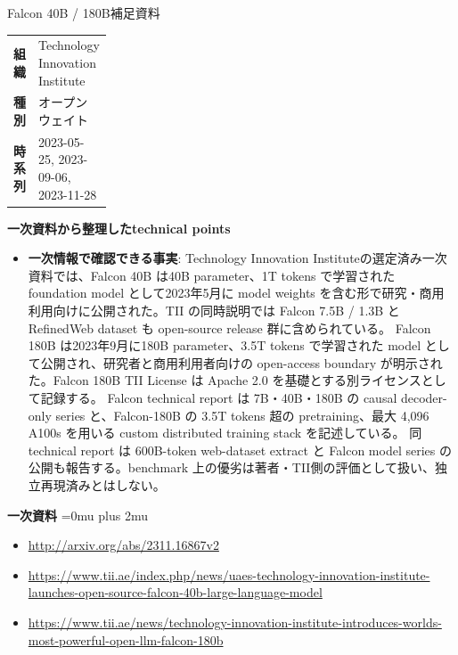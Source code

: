\begin{technicalnote}{Falcon 40B / 180B}{補足資料}
\begingroup
\begin{tabularx}{\linewidth}{@{}>{\bfseries}p{0.22\linewidth}X@{}}
組織 & Technology Innovation Institute \\
種別 & オープンウェイト \\
時系列 & 2023-05-25, 2023-09-06, 2023-11-28 \\
\end{tabularx}
\smallskip
{\bfseries 一次資料から整理したtechnical points}
\begin{itemize}[leftmargin=1.5em,itemsep=0.35em]
\item \textbf{一次情報で確認できる事実}: Technology Innovation Instituteの選定済み一次資料では、Falcon 40B は40B parameter、1T tokens で学習された foundation model として2023年5月に model weights を含む形で研究・商用利用向けに公開された。TII の同時説明では Falcon 7.5B / 1.3B と RefinedWeb dataset も open-source release 群に含められている。 Falcon 180B は2023年9月に180B parameter、3.5T tokens で学習された model として公開され、研究者と商用利用者向けの open-access boundary が明示された。Falcon 180B TII License は Apache 2.0 を基礎とする別ライセンスとして記録する。 Falcon technical report は 7B・40B・180B の causal decoder-only series と、Falcon-180B の 3.5T tokens 超の pretraining、最大 4,096 A100s を用いる custom distributed training stack を記述している。 同 technical report は 600B-token web-dataset extract と Falcon model series の公開も報告する。benchmark 上の優劣は著者・TII側の評価として扱い、独立再現済みとはしない。
\end{itemize}
\begin{minipage}{\linewidth}
\begin{samepage}
{\bfseries 一次資料}
\begingroup\sloppy
\Urlmuskip=0mu plus 2mu\relax
\begin{itemize}[leftmargin=1.5em,itemsep=0.25em]
\item {\scriptsize\url{http://arxiv.org/abs/2311.16867v2}}
\item {\scriptsize\url{https://www.tii.ae/index.php/news/uaes-technology-innovation-institute-launches-open-source-falcon-40b-large-language-model}}
\item {\scriptsize\url{https://www.tii.ae/news/technology-innovation-institute-introduces-worlds-most-powerful-open-llm-falcon-180b}}
\end{itemize}
\endgroup
\end{samepage}
\end{minipage}
\endgroup
\end{technicalnote}
\medskip

